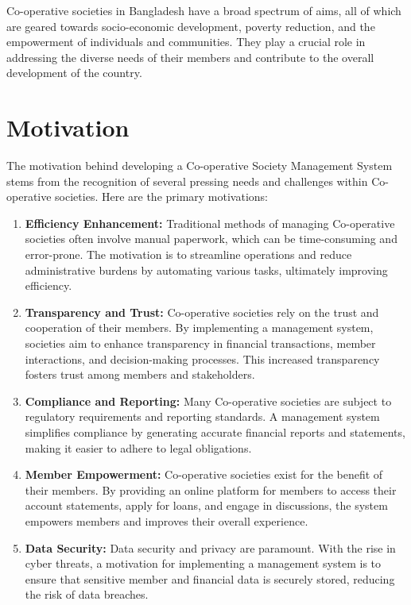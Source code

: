 Co-operative societies in Bangladesh have a broad spectrum of aims, all of which are geared towards socio-economic development, poverty reduction, and the empowerment of individuals and communities. They play a crucial role in addressing the diverse needs of their members and contribute to the overall development of the country.


\section{Motivation}

The motivation behind developing a Co-operative Society Management System stems from the recognition of several pressing needs and challenges within Co-operative societies. Here are the primary motivations:

\begin{enumerate}
    \item \textbf{Efficiency Enhancement:} Traditional methods of managing Co-operative societies often involve manual paperwork, which can be time-consuming and error-prone. The motivation is to streamline operations and reduce administrative burdens by automating various tasks, ultimately improving efficiency.
    
    \item \textbf{Transparency and Trust:} Co-operative societies rely on the trust and cooperation of their members. By implementing a management system, societies aim to enhance transparency in financial transactions, member interactions, and decision-making processes. This increased transparency fosters trust among members and stakeholders.
    
    \item \textbf{Compliance and Reporting:} Many Co-operative societies are subject to regulatory requirements and reporting standards. A management system simplifies compliance by generating accurate financial reports and statements, making it easier to adhere to legal obligations.
    
    \item \textbf{Member Empowerment:} Co-operative societies exist for the benefit of their members. By providing an online platform for members to access their account statements, apply for loans, and engage in discussions, the system empowers members and improves their overall experience.
    
    \item \textbf{Data Security:} Data security and privacy are paramount. With the rise in cyber threats, a motivation for implementing a management system is to ensure that sensitive member and financial data is securely stored, reducing the risk of data breaches.
    

\end{enumerate}
